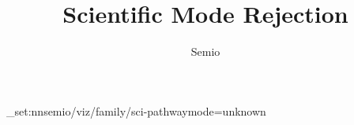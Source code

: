 \documentclass[type=paper,language=en,theme=light]{semio}
\title{Scientific Mode Rejection}
\author{Semio}
\date{}
\begin{document}
\SemioVizProbePage
\ExplSyntaxOn\keys_set:nn{semio/viz/family/sci-pathway}{mode=unknown}\ExplSyntaxOff
{}
\SemioVizProbeEnd
\end{document}
